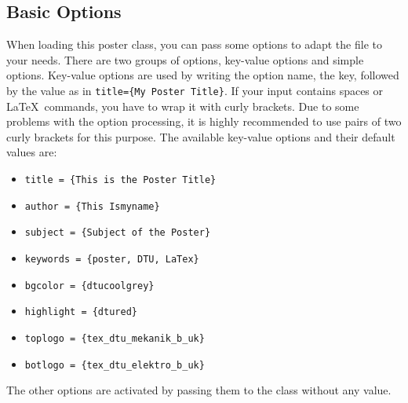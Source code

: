 \documentclass[
    ,draft
]{dtuposter}
\begin{document}
%
%
\begin{dtuposterhead} %
\end{dtuposterhead}
%
%
\begin{dtupostercontent}
\section{Basic Options}
When loading this poster class, you can pass some options to adapt the 
file to your needs. There are two groups of options, key-value options 
and simple options. Key-value options are used by writing the option 
name, the key, followed by the value as in \texttt{title=\{My Poster 
Title\}}. If your input contains spaces or \LaTeX\ commands, you have to
wrap it with curly brackets. Due to some problems with the option 
processing, it is highly recommended to use pairs of two curly brackets
for this purpose. The available key-value options and their 
default values are:
\begin{itemize}
\item \texttt{title = \{This is the Poster Title\}}
\item \texttt{author = \{This Ismyname\}}
\item \texttt{subject = \{Subject of the Poster\}}
\item \texttt{keywords = \{poster, DTU, LaTex\}}
\item \texttt{bgcolor = \{dtucoolgrey\}}
\item \texttt{highlight = \{dtured\}}
\item \texttt{toplogo = \{tex\_dtu\_mekanik\_b\_uk\}}
\item \texttt{botlogo = \{tex\_dtu\_elektro\_b\_uk\}}
\end{itemize}
The other options are activated by passing them to the class without any value.


\end{dtupostercontent}
\end{document}
